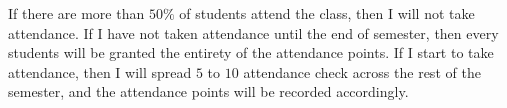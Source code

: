 \documentclass[12pt]{article}
\begin{document}
If there are more than $ 50\% $ of students attend the class, then I will not take attendance.
If I have not taken attendance until the end of semester, then every students will be granted the entirety of the attendance points.
If I start to take attendance, then I will spread $ 5 $ to $ 10 $ attendance check across the rest of the semester, and the attendance points will be recorded accordingly.








\end{document}

